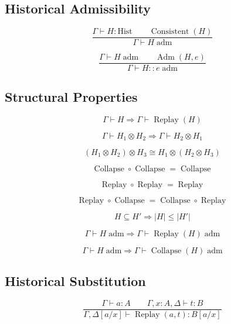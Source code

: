\documentclass[12pt,oneside]{article}
\theoremstyle{definition}
\theoremstyle{remark}
\begin{document}
\subsection*{Historical Admissibility}

\[
\frac
{\Gamma\vdash
H:\mathrm{Hist}
\qquad
\operatorname{Consistent}(H)}
{\Gamma\vdash
H\;\mathrm{adm}}
\]

\[
\frac
{\Gamma\vdash
H\;\mathrm{adm}
\qquad
\operatorname{Adm}(H,e)}
{\Gamma\vdash
H::e\;\mathrm{adm}}
\]

\subsection*{Structural Properties}

\[
\Gamma\vdash H
\Longrightarrow
\Gamma\vdash
\operatorname{Replay}(H)
\]

\[
\Gamma\vdash
H_1\otimes H_2
\Longrightarrow
\Gamma\vdash
H_2\otimes H_1
\]

\[
(H_1\otimes H_2)\otimes H_3
\cong
H_1\otimes(H_2\otimes H_3)
\]

\[
\operatorname{Collapse}
\circ
\operatorname{Collapse}
=
\operatorname{Collapse}
\]

\[
\operatorname{Replay}
\circ
\operatorname{Replay}
=
\operatorname{Replay}
\]

\[
\operatorname{Replay}
\circ
\operatorname{Collapse}
=
\operatorname{Collapse}
\circ
\operatorname{Replay}
\]

\[
H
\subseteq
H'
\Longrightarrow
|H|
\le
|H'|
\]

\[
\Gamma\vdash
H\;\mathrm{adm}
\Longrightarrow
\Gamma\vdash
\operatorname{Replay}(H)\;\mathrm{adm}
\]

\[
\Gamma\vdash
H\;\mathrm{adm}
\Longrightarrow
\Gamma\vdash
\operatorname{Collapse}(H)\;\mathrm{adm}
\]

\subsection*{Historical Substitution}

\[
\frac
{\Gamma\vdash
a:A
\qquad
\Gamma,x:A,\Delta\vdash t:B}
{\Gamma,\Delta[a/x]
\vdash
\operatorname{Replay}(a,t)
:
B[a/x]}
\]
\end{document}
